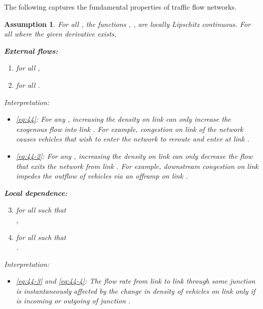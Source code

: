 \documentclass[letterpaper, 10 pt, conference]{ieeeconf}
\newtheorem{assum}{Assumption}
\begin{document}
The following captures the fundamental properties of traffic flow networks.
\begin{assum}
\label{assum:main}
For all , the functions , ,  are locally Lipschitz continuous. For all  where the given derivative exists,

\noindent \textbf{External flows:}
  \begin{enumerate}[label={(A\arabic*)},labelindent=*,leftmargin=*]
\item\label{eq:44}
  for all ,\\
\item \label{eq:44-2}    for all .
  \end{enumerate}
Interpretation:
  \begin{itemize}[leftmargin=*]
\item \ref{eq:44}: For any , increasing the density on link  can only increase the exogenous flow into link . For example, congestion on link  of the network causes vehicles that wish to enter the network to reroute and enter at link .
\item \ref{eq:44-2}: For any , increasing the density on link  can only decrease the flow that exits the network from link . For example, downstream congestion on link  impedes the outflow of vehicles via an offramp on link . 
  \end{itemize}
\noindent \textbf{Local dependence:}
\begin{enumerate}[label={(A\arabic*)},labelindent=*,leftmargin=*]
\setcounter{enumi}{2}
\item \label{eq:44-3}   for all  such that \\,
\item \label{eq:44-4}   for all  such that  \\ .
  \end{enumerate}
Interpretation:
\begin{itemize}[leftmargin=*]
\item \ref{eq:44-3} and \ref{eq:44-4}: The flow rate from link  to link  through some junction  is instantaneously affected by the change in density of vehicles on link  only if  is incoming or outgoing of junction .
\end{itemize}


\end{assum}
\end{document}
